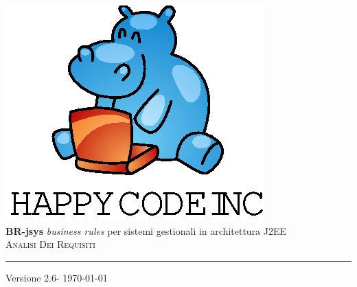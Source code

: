 \documentclass[11pt,titlepage,a4paper]{report}
\begin{document}
\newcommand{\lv}{2.6} %
\newcommand{\dt}{ Analisi Dei Requisiti }%
\newcommand{\Glossario}{ Glossario.1.8.pdf }



\begin{titlepage}\begin{center}
\vspace*{0.5in}
\includegraphics{logo.eps}
\vspace*{0.2in} \\
{\Large \textbf{BR-jsys}}
{\Large \emph{business rules} per sistemi gestionali in architettura J2EE } 
\vspace{2in} \\
\Huge \textsc{ \dt }
\par\rule{10cm}{0.4pt} \par {\large Versione \lv - \today} \\
\end{center}\end{titlepage}
\vspace*{0.5in}
\end{document}
